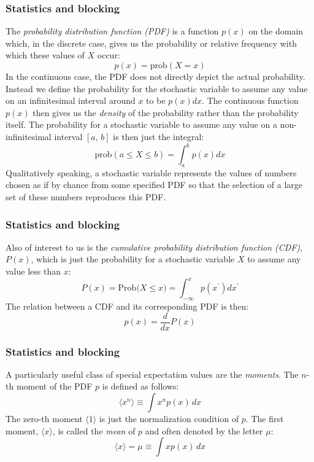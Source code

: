 \documentclass{beamer}
\begin{document}
\begin{frame}
\frametitle{Statistics and blocking}

\begin{block}{}
The \emph{probability distribution function (PDF)} is a function
$p(x)$ on the domain which, in the discrete case, gives us the
probability or relative frequency with which these values of $X$ occur:
\[
p(x) = \mathrm{prob}(X=x)
\]
In the continuous case, the PDF does not directly depict the
actual probability. Instead we define the probability for the
stochastic variable to assume any value on an infinitesimal interval
around $x$ to be $p(x)dx$. The continuous function $p(x)$ then gives us
the \emph{density} of the probability rather than the probability
itself. The probability for a stochastic variable to assume any value
on a non-infinitesimal interval $[a,\,b]$ is then just the integral:
\[
\mathrm{prob}(a\leq X\leq b) = \int_a^b p(x)dx
\]
Qualitatively speaking, a stochastic variable represents the values of
numbers chosen as if by chance from some specified PDF so that the
selection of a large set of these numbers reproduces this PDF.
\end{block}
\end{frame}

\begin{frame}
\frametitle{Statistics and blocking}

\begin{block}{}
Also of interest to us is the \emph{cumulative probability distribution function (CDF)}, $P(x)$, which is just the probability
for a stochastic variable $X$ to assume any value less than $x$:
\[
P(x)=\mathrm{Prob(}X\leq x\mathrm{)} =\int_{-\infty}^x p(x^{\prime})dx^{\prime}
\]
The relation between a CDF and its corresponding PDF is then:
\[
p(x) = \frac{d}{dx}P(x)
\]
\end{block}
\end{frame}

\begin{frame}
\frametitle{Statistics and blocking}

\begin{block}{}
A particularly useful class of special expectation values are the
\emph{moments}. The $n$-th moment of the PDF $p$ is defined as
follows:
\[
\langle x^n\rangle \equiv \int\! x^n p(x)\,dx
\]
The zero-th moment $\langle 1\rangle$ is just the normalization condition of
$p$. The first moment, $\langle x\rangle$, is called the \emph{mean} of $p$
and often denoted by the letter $\mu$:
\[
\langle x\rangle = \mu \equiv \int\! x p(x)\,dx
\]
\end{block}
\end{frame}
\end{document}
